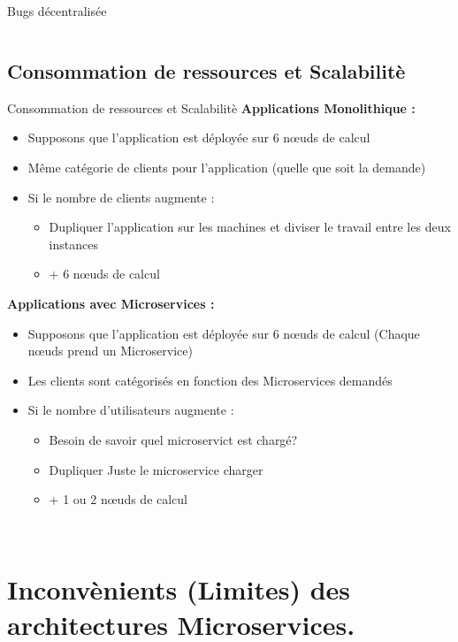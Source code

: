 \documentclass{beamer}
\begin{document}
\begin{frame}{Bugs d\'ecentralis\'ee}
\begin{columns}
    \end{columns}
    
\end{frame}
\subsection{Consommation de ressources et Scalabilit\`e}
\begin{frame}{Consommation de ressources et Scalabilit\`e}
        \textbf{Applications Monolithique :}
        \begin{itemize}
            \item Supposons que l'application est déployée sur \alert{6 nœuds} de calcul
            \item Même catégorie de clients pour l'application (quelle que soit la demande) 
            \item Si le nombre de clients augmente : 
                \begin{itemize}
                    \item Dupliquer l'application sur les machines et diviser le travail entre les deux instances
                    \item + \alert{6 nœuds} de calcul
                \end{itemize}
        \end{itemize}
        \pause
        \textbf{Applications avec Microservices : }
        \begin{itemize}
            \item Supposons que l'application est déployée sur \alert{6 nœuds} de calcul \alert{(Chaque nœuds prend un Microservice)}
            \item Les clients sont catégorisés en fonction des Microservices demandés
            \item Si le nombre d'utilisateurs augmente : 
                \begin{itemize}
                    \item Besoin de savoir quel microservict est chargé?
                    \item Dupliquer Juste le microservice charger
                    \item + \alert{1 ou 2 nœuds} de calcul
                \end{itemize}
        \end{itemize}
\
\end{frame}

\section{Inconv\`enients (Limites) des architectures Microservices.}
\end{document}
